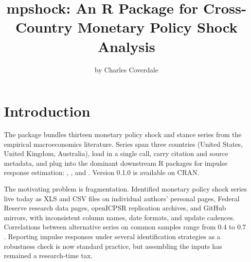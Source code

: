 \title{mpshock: An R Package for Cross-Country Monetary Policy Shock Analysis}


\author{by Charles Coverdale}

\maketitle


\section{Introduction}\label{introduction}

The  package bundles thirteen monetary policy shock and stance series from the empirical macroeconomics literature. Series span three countries (United States, United Kingdom, Australia), load in a single call, carry citation and source metadata, and plug into the dominant downstream R packages for impulse response estimation:  \citep{adammer2019lpirfs},  \citep{kuschnig2021bvar}, and  \citep{pfaff2008var}. Version 0.1.0 is available on CRAN.

The motivating problem is fragmentation. Identified monetary policy shock series live today as XLS and CSV files on individual authors' personal pages, Federal Reserve research data pages, openICPSR replication archives, and GitHub mirrors, with inconsistent column names, date formats, and update cadences. Correlations between alternative series on common samples range from 0.4 to 0.7 \citep{brennan2024monetary}. Reporting impulse responses under several identification strategies as a robustness check is now standard practice, but assembling the inputs has remained a research-time tax.

